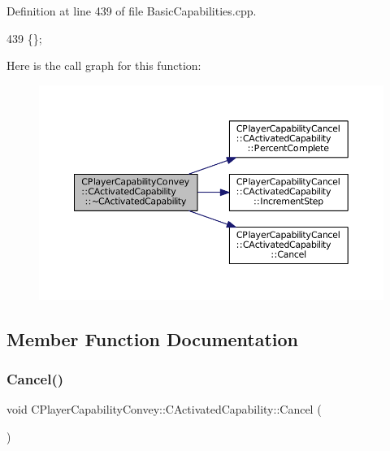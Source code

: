 Definition at line 439 of file Basic\+Capabilities.\+cpp.


\begin{DoxyCode}
439 \{\};
\end{DoxyCode}
Here is the call graph for this function\+:\nopagebreak
\begin{figure}[H]
\begin{center}
\leavevmode
\includegraphics[width=350pt]{classCPlayerCapabilityConvey_1_1CActivatedCapability_a10c78ea328de946070399c5596915641_cgraph}
\end{center}
\end{figure}


\subsection{Member Function Documentation}
\hypertarget{classCPlayerCapabilityConvey_1_1CActivatedCapability_ad84a94a1ae3647ea160e262a0154e229}{}\label{classCPlayerCapabilityConvey_1_1CActivatedCapability_ad84a94a1ae3647ea160e262a0154e229} 
\subsubsection{\texorpdfstring{Cancel()}{Cancel()}}
{\footnotesize\ttfamily void C\+Player\+Capability\+Convey\+::\+C\+Activated\+Capability\+::\+Cancel (\begin{DoxyParamCaption}{ }\end{DoxyParamCaption})\hspace{0.3cm}{\ttfamily [virtual]}}



